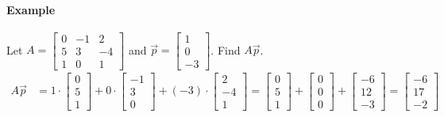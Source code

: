 \paragraph*{Example} Let $A = \begin{bmatrix}
    0 & -1 & 2 \\
    5 & 3 & -4 \\
    1 & 0 & 1
\end{bmatrix}$ and $\vec{p} = \begin{bmatrix} 1 \\ 0 \\ -3 \end{bmatrix}$. Find $A\vec{p}$.
\begin{align*}
A\vec{p} &= 1 \cdot \begin{bmatrix} 0 \\ 5 \\ 1 \end{bmatrix} + 0 \cdot \begin{bmatrix} -1 \\ 3 \\ 0 \end{bmatrix} + (-3) \cdot \begin{bmatrix} 2 \\ -4 \\ 1 \end{bmatrix} = \begin{bmatrix} 0 \\ 5 \\ 1 \end{bmatrix} + \begin{bmatrix} 0 \\ 0 \\ 0 \end{bmatrix} + \begin{bmatrix} -6 \\ 12 \\ -3 \end{bmatrix} = \begin{bmatrix} -6 \\ 17 \\ -2 \end{bmatrix}
\end{align*}

